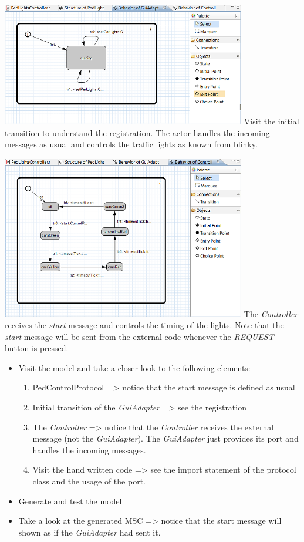 \includegraphics[width=0.8\textwidth]{images/030-PedLights02.png}
Visit the initial transition to understand the registration. The actor handles the incoming messages as 
usual and controls the traffic lights as known from blinky. 

\includegraphics[width=0.8\textwidth]{images/030-PedLights03.png}
The \textit{Controller} receives the \textit{start} message and controls the timing of the lights. Note 
that the \textit{start} message will be sent from the external code whenever the \textit{REQUEST} button 
is pressed.

\begin{itemize}
\item  Visit the model and take a closer look to the following elements:
\begin{enumerate}
\item PedControlProtocol => notice that the start message is defined as usual
\item Initial transition of the \textit{GuiAdapter} => see the registration
\item The \textit{Controller} => notice that the \textit{Controller} receives the external message (not 
the \textit{GuiAdapter}). The \textit{GuiAdapter} just provides its port and handles the incoming messages.
\item Visit the hand written code => see the import statement of the protocol class and the usage of the 
port.
\end{enumerate}
\item Generate and test the model
\item Take a look at the generated MSC => notice that the start message will shown as if the 
\textit{GuiAdapter} had sent it.
\end{itemize}

